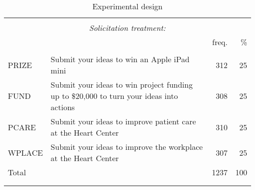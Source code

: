 \begin{table}
\centering
\caption{Experimental design}
\label{experimental-design}
\begin{tabular}{@{}lp{5cm}>{\raggedright}rr}
  \\[-1.8ex]\hline \hline \\[-1.8ex]
 & \multicolumn{1}{c}{\emph{Solicitation treatment:}}
						& \multicolumn{2}{c}{\emph{Employees:}}\\
						\cmidrule(lr){2-2}\cmidrule(lr){3-4} & 	 & freq. & \% \\ 
  \hline \\[-1.86ex]
PRIZE & Submit your ideas to win an Apple iPad mini & 312 & 25 \\ 
  [1.8ex] FUND & Submit your ideas to win project funding up to \$20,000 
			to turn your ideas into actions & 308 & 25 \\ 
  [1.8ex] PCARE & Submit your ideas to improve patient care at the Heart Center & 310 & 25 \\ 
  [1.8ex] WPLACE & Submit your ideas to improve the workplace at the Heart Center & 307 & 25 \\ 
  [1.8ex] Total &  & 1237 & 100 \\ 
   \\[-1.8ex]\hline \hline \\[-1.8ex]
\end{tabular}
\end{table}
